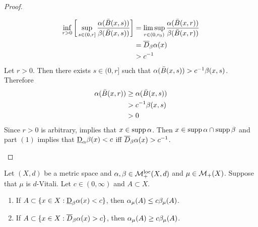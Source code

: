 \documentclass{book}
\begin{document}
\begin{proof}
\begin{enumerate}
\begin{itemize}
				\begin{align*}
					\inf_{r > 0} \bigg[ \sup\limits_{s \in (0,r]} \frac{\alpha(\bar{B}(x, s))}{\beta(\bar{B}(x, s))} \bigg] 
					& = \limsup_{r \in (0, r_0)} \frac{\alpha(\bar{B}(x, r))}{\beta(\bar{B}(x, r))} \\
					& = \overline{D}_{\beta}\alpha (x) \\
					& > c^{-1} 
				\end{align*}
				Let $r > 0$.  Then  there exists $s \in (0,r]$ such that $\alpha(\bar{B}(x, s)) > c^{-1} \beta(x, s)$. Therefore 
				\begin{align*}
					\alpha(\bar{B}(x, r))
					& \geq \alpha(\bar{B}(x, s)) \\
					& > c^{-1} \beta(x, s) \\
					& > 0
				\end{align*}
				Since $r > 0$ is arbitrary,  implies that $x \in \operatorname{supp} \alpha$. Then $x \in \operatorname{supp} \alpha \cap \operatorname{supp} \beta$ and part $(1)$ implies that $\underbar{D}_{\alpha} \beta (x) < c$ iff $\overline{D}_{\beta}\alpha(x) > c^{-1}$.
			\end{itemize}
		\end{enumerate}
	\end{proof}
	
	\begin{ex} 
		Let $(X, d)$ be a metric space and $\alpha, \beta \in \mathcal{M}_+^{\text{loc}}(X, d)$ and $\mu \in \mathcal{M}_+(X)$. Suppose that $\mu$ is $d$-Vitali. Let $c \in (0,\infty)$ and $A \subset X$. 
		\begin{enumerate}
			\item If $A \subset \{x \in X: \underbar{D}_{\beta}\alpha(x) < c\}$, then $\alpha_{\mu}(A) \leq c \beta_{\mu}(A)$. 
			\item If $A \subset \{x \in X: \overline{D}_{\beta}\alpha(x) > c\}$, then $\alpha_{\mu}(A) \geq c \beta_{\mu}(A)$. 
		\end{enumerate}
	\end{ex}
	
\end{document}
